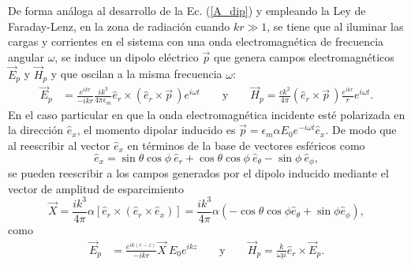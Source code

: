  De forma análoga al desarrollo de la Ec. (\ref{A_dip}) y empleando la Ley de Faraday-Lenz, en la zona de radiación cuando $kr\gg 1$, se tiene que al iluminar las cargas y corrientes en el sistema con una onda electromagnética de frecuencia angular $\omega$, se induce un dipolo eléctrico $\Vec{p}$ que genera campos electromagnéticos $\Vec{E}_p$ y $\Vec{H}_p$ y  que oscilan a la misma frecuencia $\omega$: 
\begin{align}
    \Vec{E}_p&=\frac{e^{ikr}}{-ikr}\frac{ik^3}{4\pi\epsilon_m}\hat{e}_r\times(\hat{e}_r\times \Vec{p}\,) e^{i\omega t}\qquad\text{y}\qquad
    \Vec{H}_p=\frac{ck^2}{4\pi}(\hat{e}_r\times\Vec{p}\,)\frac{e^{ikr}}{r}e^{i\omega t}.
\end{align}
En el caso particular en que la onda electromagnética incidente esté polarizada en la dirección $\hat{e}_x$, el momento dipolar inducido es $\Vec{p}=\epsilon_m \alpha E_0 e^{-i\omega t}\hat{e}_x$. De modo que al reescribir al vector $\hat{e}_x$ en términos de la base de vectores esféricos como \cite{Griffiths}
\begin{equation}
	\hat{e}_x=\sin\theta\cos\phi\: \hat{e}_r+\cos\theta\cos\phi\: \hat{e}_{\theta}-\sin\phi \:\hat{e}_{\phi},
\end{equation}
se pueden reescribir a los campos generados por el dipolo inducido mediante el vector de amplitud de esparcimiento
\begin{equation}
	\Vec{X}=\frac{ik^3}{4\pi}\alpha \left[ \hat{e}_r\times(\hat{e}_r\times \hat{e}_x)\right]=\frac{ik^3}{4\pi}\alpha \left(-\cos\theta\cos\phi \hat{e}_{\theta}+\sin\phi \hat{e}_{\phi} \right),
	\label{Xvec}
\end{equation}
como \cite{Bohren}
 \begin{align}
 	\Vec{E}_{p}&=\frac{e^{ik(r-z)}}{-ikr}\Vec{X}\:E_0 e^{ikz}\qquad\text{y}\qquad
 	\Vec{H}_{p}=\frac{k}{\omega\mu}\hat{e}_r\times\Vec{E}_{p}.
 	\label{EH_s}
 \end{align}

